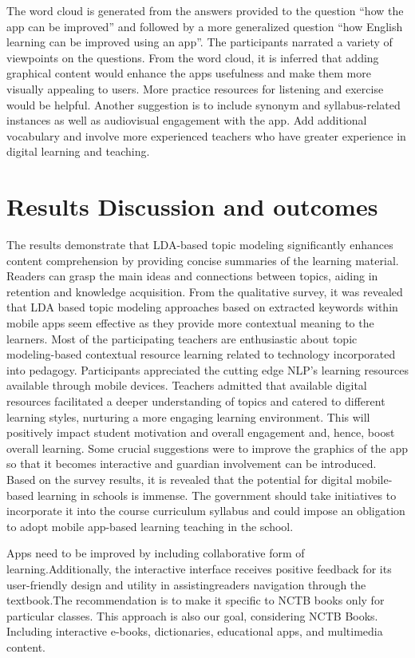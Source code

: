 \documentclass[sn-mathphys,Numbered]{sn-jnl}%
\theoremstyle{thmstyleone}%
\theoremstyle{thmstyletwo}%
\theoremstyle{thmstylethree}%
\begin{document}
The word cloud is generated from the answers provided to the question ``how the app can be improved'' and followed by a more generalized question ``how English learning can be improved using an app''. The participants narrated a variety of viewpoints on the questions. From the word cloud, it is inferred that adding graphical content would enhance the apps\textquotesingle{} usefulness and make them more visually appealing to users. More practice resources for listening and exercise would be helpful. Another suggestion is to include synonym and syllabus-related instances as well as audiovisual engagement with the app. Add additional vocabulary and involve more experienced teachers who have greater experience in digital learning and teaching.

\section{Results Discussion and outcomes}\label{res_dis}
The results demonstrate that LDA-based topic modeling significantly enhances content comprehension by providing concise summaries of the learning material. Readers can grasp the main ideas and connections between topics, aiding in retention and knowledge acquisition. From the qualitative survey, it was revealed that LDA based topic modeling approaches based on extracted keywords within mobile apps seem effective as they provide more contextual meaning to the learners. Most of the participating teachers are enthusiastic about topic modeling-based contextual resource learning related to technology incorporated into pedagogy. Participants appreciated the cutting edge NLP's learning resources available through mobile devices. Teachers admitted that available digital resources facilitated a deeper understanding of topics and catered to different learning styles, nurturing a more engaging learning environment. This will positively impact student motivation and overall engagement and, hence, boost overall learning. Some crucial suggestions were to improve the graphics of the app so that it becomes interactive and guardian involvement can be introduced. Based on the survey results, it is revealed that the potential for digital mobile-based learning in schools is immense. The government should take initiatives to incorporate it into the course curriculum syllabus and could impose an obligation to adopt mobile app-based learning teaching in the school.

Apps need to be improved by including collaborative form of learning.Additionally, the interactive interface receives positive feedback for its user-friendly design and utility in assistingreaders\textquotesingle{} navigation through the textbook.The recommendation is to make it specific to NCTB books only for particular classes. This approach is also our goal, considering NCTB Books. Including interactive e-books, dictionaries, educational apps, and multimedia content.
\end{document}
